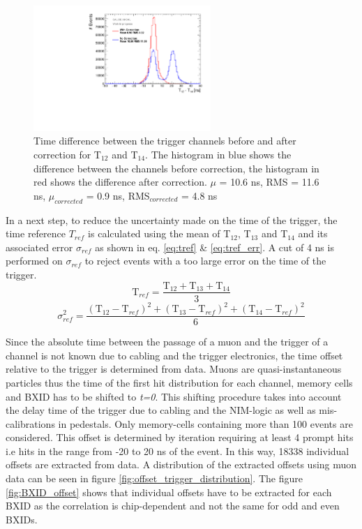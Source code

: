 \documentclass[twoside,a4paper,11pt]{article}
\begin{document}
\begin{figure}[htbp]
\begin{center}
\includegraphics[width=0.6\textwidth]{fig/T0s/T0_Resolution_5.pdf}
\caption{Time difference between the trigger channels before and after correction for T$_{12}$ and T$_{14}$. The histogram in blue shows the difference between the channels before correction, the histogram in red shows the difference after correction. $\mu$ = 10.6 ns, RMS = 11.6 ns, $\mu_{corrected}$ = 0.9 ns, RMS$_{corrected}$ = 4.8 ns}
\label{fig:T0_Correction}
\end{center}
\end{figure}

In a next step, to reduce the uncertainty made on the time of the trigger, the time reference $T_{ref}$ is calculated using the mean of T$_{12}$, T$_{13}$ and T$_{14}$ and its associated error $\sigma_{ref}$ as shown in eq. \ref{eq:tref} \& \ref{eq:tref_err}. A cut of 4 ns is performed on $\sigma_{ref}$ to reject events with a too large error on the time of the trigger.
\begin{equation} \label{eq:tref}
\text{T}_{ref} = \frac{\text{T}_{12} + \text{T}_{13} + \text{T}_{14}}{3}
\end{equation}
\begin{equation} \label{eq:tref_err}
\sigma_{ref}^2 = \frac{ (\text{T}_{12} - \text{T}_{ref})^2 + (\text{T}_{13} - \text{T}_{ref})^2  + (\text{T}_{14} - \text{T}_{ref})^2 }{6}
\end{equation}

Since the absolute time between the passage of a muon and the trigger of a channel is not known due to cabling and the trigger electronics, the time offset relative to the trigger is determined from data. Muons are quasi-instantaneous particles thus the time of the first hit distribution for each channel, memory cells and BXID has to be shifted to \textit{t=0}. This shifting procedure takes into account the delay time of the trigger due to cabling and the NIM-logic as well as mis-calibrations in pedestals. Only memory-cells containing more than 100 events are considered. This offset is determined by iteration requiring at least 4 prompt hits i.e hits in the range from -20 to 20 ns of the event. In this way, 18338 individual offsets are extracted from data. A distribution of the extracted offsets using muon data can be seen in figure \ref{fig:offset_trigger_distribution}. The figure \ref{fig:BXID_offset} shows that individual offsets have to be extracted for each BXID as the correlation is chip-dependent and not the same for odd and even BXIDs.
\end{document}
